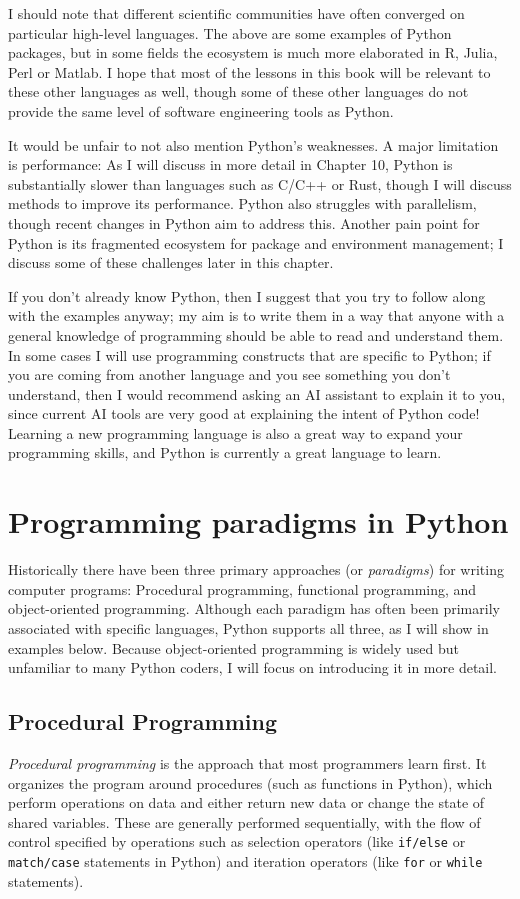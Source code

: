 I should note that different scientific communities have often converged on particular high-level languages.
The above are some examples of Python packages, but in some fields the ecosystem is much more elaborated in R, Julia, Perl or Matlab.
I hope that most of the lessons in this book will be relevant to these other languages as well, though some of these other languages do not provide the same level of software engineering tools as Python.

It would be unfair to not also mention Python's weaknesses. A major limitation is performance: As I will discuss in more detail in Chapter 10, Python is substantially slower than languages such as C/C++ or Rust, though I will discuss methods to improve its performance.  Python also struggles with parallelism, though recent changes in  Python aim to address this.  Another pain point for Python is its fragmented ecosystem for package and environment management; I discuss some of these challenges later in this chapter.

If you don't already know Python, then I suggest that you try to follow along with the examples anyway; my aim is to write them in a way that anyone with a general knowledge of programming should be able to read and understand them.
In some cases I will use programming constructs that are specific to Python; if you are coming from another language and you see something you don't understand, then I would recommend asking an AI assistant to explain it to you, since current AI tools are very good at explaining the intent of Python code! Learning a new programming language is also a great way to expand your programming skills, and Python is currently a great language to learn.

\section{Programming paradigms in Python}

Historically there have been three primary approaches (or \textit{paradigms}) for writing computer programs: Procedural programming, functional programming, and object-oriented programming.  Although each paradigm has often been primarily associated with specific languages, Python supports all three, as I will show in examples below.  Because object-oriented programming is widely used but unfamiliar to many Python coders, I will focus on introducing it in more detail.

\subsection{Procedural Programming}
\textit{Procedural programming} is the approach that most programmers learn first.  It organizes the program around procedures (such as functions in Python), which perform operations on data and either return new data or change the state of shared variables. These are generally performed sequentially, with the flow of control specified by operations such as selection operators (like \texttt{if/else} or \texttt{match/case} statements in Python) and iteration operators (like \texttt{for} or \texttt{while} statements).

